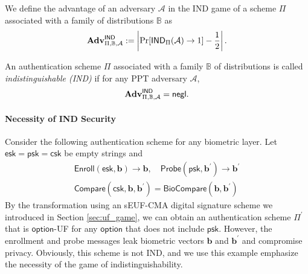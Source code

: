 



We define the advantage of an adversary $\mathcal{A}$ in the \textsf{IND} game of a scheme $\Pi$ associated with a family of distributions $\mathbb{B}$ as
\[
	\mathbf{Adv}^{\textsf{IND}}_{\Pi, \mathbb{B}, \mathcal{A}} := \left |\Pr[\textsf{IND}_{\Pi}(\mathcal{A}) \to 1] - \frac{1}{2} \right|.
\]

An authentication scheme $\Pi$ associated with a family $\mathbb{B}$ of distributions is called \emph{indistinguishable (IND)} if for any PPT adversary $\mathcal{A}$,
\[
	\mathbf{Adv}^{\textsf{IND}}_{\Pi, \mathbb{B}, \mathcal{A}} = \mathsf{negl}.
\]

\paragraph{Necessity of IND Security}
Consider the following authentication scheme for any biometric layer. Let $\textsf{esk} = \textsf{psk} = \textsf{csk}$ be empty strings and
\begin{gather*}
	\textsf{Enroll}(\textsf{esk}, \mathbf{b}) \to \mathbf{b}, \quad \textsf{Probe}(\textsf{psk}, \mathbf{b}^\prime ) \to \mathbf{b}^\prime \\
	\textsf{Compare}(\textsf{csk}, \mathbf{b}, \mathbf{b}^\prime) = \textsf{BioCompare}(\mathbf{b}, \mathbf{b}^\prime ) 
\end{gather*}
By the transformation using an sEUF-CMA digital signature scheme we introduced in Section \ref{sec:uf_game}, we can obtain an authentication scheme $\Pi^\prime$ that is $\textsf{option}$-UF for any $\textsf{option}$ that does not include $\textsf{psk}$.
However, the enrollment and probe messages leak biometric vectors $\mathbf{b}$ and $\mathbf{b}^\prime$ and compromise privacy. Obviously, this scheme is not IND, and we use this example emphasize the necessity of the game of indistinguishability.


